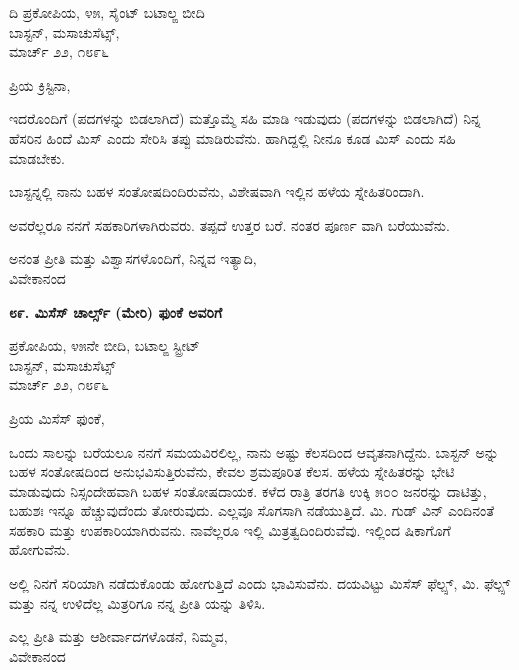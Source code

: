 \begin{flushright}
 ದಿ ಪ್ರಕೋಪಿಯ, ೪೫, ಸೈಂಟ್ ಬಟಾಲ್ಙ ಬೀದಿ\\ಬಾಸ್ಟನ್, ಮಸಾಚುಸೆಟ್ಸ್,\\ಮಾರ್ಚ್ ೨೨, ೧೮೯೬
\end{flushright}

ಪ್ರಿಯ ಕ್ರಿಸ್ಟಿನಾ,

ಇದರೊಂದಿಗೆ (ಪದಗಳನ್ನು ಬಿಡಲಾಗಿದೆ) ಮತ್ತೊಮ್ಮೆ ಸಹಿ ಮಾಡಿ ಇಡುವುದು (ಪದಗಳನ್ನು ಬಿಡಲಾಗಿದೆ) ನಿನ್ನ ಹೆಸರಿನ ಹಿಂದೆ ಮಿಸ್ ಎಂದು ಸೇರಿಸಿ ತಪ್ಪು ಮಾಡಿರುವೆನು. ಹಾಗಿದ್ದಲ್ಲಿ ನೀನೂ ಕೂಡ ಮಿಸ್ ಎಂದು ಸಹಿ ಮಾಡಬೇಕು.

ಬಾಸ್ಟನ್ನಲ್ಲಿ ನಾನು ಬಹಳ ಸಂತೋಷದಿಂದಿರುವೆನು, ವಿಶೇಷವಾಗಿ ಇಲ್ಲಿನ ಹಳೆಯ ಸ್ನೇಹಿತರಿಂದಾಗಿ.

ಅವರೆಲ್ಲರೂ ನನಗೆ ಸಹಕಾರಿಗಳಾಗಿರುವರು. ತಪ್ಪದೆ ಉತ್ತರ ಬರೆ. ನಂತರ ಪೂರ್ಣ ವಾಗಿ ಬರೆಯುವೆನು.

\begin{flushright}
ಅನಂತ ಪ್ರೀತಿ ಮತ್ತು ವಿಶ್ವಾಸಗಳೊಂದಿಗೆ, ನಿನ್ನವ ಇತ್ಯಾದಿ,\\ವಿವೇಕಾನಂದ
\end{flushright}

\begin{center}
\textbf{೮೯. ಮಿಸೆಸ್ ಚಾರ್ಲ್ಸ್ (ಮೇರಿ) ಫುಂಕೆ ಅವರಿಗೆ}
\end{center}

\begin{flushright}
 ಪ್ರಕೋಪಿಯ, ೪೫ನೇ ಬೀದಿ, ಬಟಾಲ್ಙ ಸ್ಟ್ರೀಟ್\\ಬಾಸ್ಟನ್, ಮಸಾಚುಸೆಟ್ಸ್\\ಮಾರ್ಚ್ ೨೨, ೧೮೯೬
\end{flushright}

ಪ್ರಿಯ ಮಿಸೆಸ್ ಫುಂಕೆ,

ಒಂದು ಸಾಲನ್ನು ಬರೆಯಲೂ ನನಗೆ ಸಮಯವಿರಲಿಲ್ಲ, ನಾನು ಅಷ್ಟು ಕೆಲಸದಿಂದ ಆವೃತನಾಗಿದ್ದೆನು. ಬಾಸ್ಟನ್ ಅನ್ನು ಬಹಳ ಸಂತೋಷದಿಂದ ಅನುಭವಿಸುತ್ತಿರುವೆನು, ಕೇವಲ ಶ್ರಮಪೂರಿತ ಕೆಲಸ. ಹಳೆಯ ಸ್ನೇಹಿತರನ್ನು ಭೇಟಿ ಮಾಡುವುದು ನಿಸ್ಸಂದೇಹವಾಗಿ ಬಹಳ ಸಂತೋಷದಾಯಕ. ಕಳೆದ ರಾತ್ರಿ ತರಗತಿ ಉಕ್ಕಿ ೫೦೦ ಜನರನ್ನು ದಾಟಿತ್ತು, ಬಹುಶಃ ಇನ್ನೂ ಹೆಚ್ಚುವುದೆಂದು ತೋರುವುದು. ಎಲ್ಲವೂ ಸೊಗಸಾಗಿ ನಡೆಯುತ್ತಿದೆ. ಮಿ. ಗುಡ್ ವಿನ್ ಎಂದಿನಂತೆ ಸಹಕಾರಿ ಮತ್ತು ಉಪಕಾರಿಯಾಗಿರುವನು. ನಾವೆಲ್ಲರೂ ಇಲ್ಲಿ ಮಿತ್ರತ್ವದಿಂದಿರುವೆವು. ಇಲ್ಲಿಂದ ಷಿಕಾಗೊಗೆ ಹೋಗುವೆನು.

ಅಲ್ಲಿ ನಿನಗೆ ಸರಿಯಾಗಿ ನಡೆದುಕೊಂಡು ಹೋಗುತ್ತಿದೆ ಎಂದು ಭಾವಿಸುವೆನು. ದಯವಿಟ್ಟು ಮಿಸೆಸ್ ಫೆಲ್ಪ್ಸ್, ಮಿ. ಫೆಲ್ಪ್ಸ್ ಮತ್ತು ನನ್ನ ಉಳಿದೆಲ್ಲ ಮಿತ್ರರಿಗೂ ನನ್ನ ಪ್ರೀತಿ ಯನ್ನು ತಿಳಿಸಿ.

\begin{flushright}
ಎಲ್ಲ ಪ್ರೀತಿ ಮತ್ತು ಆಶೀರ್ವಾದಗಳೊಡನೆ, ನಿಮ್ಮವ,\\ವಿವೇಕಾನಂದ
\end{flushright}

